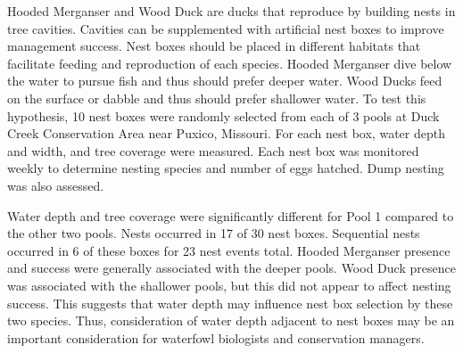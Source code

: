 
Hooded Merganser and Wood Duck are ducks that reproduce by building nests in tree cavities. Cavities can be supplemented with artificial nest boxes to improve management success. Nest boxes should be placed in different habitats that facilitate feeding and reproduction of each species.  Hooded Merganser dive below the water to pursue fish and thus should prefer deeper water. Wood Ducks feed on the surface or dabble and thus should prefer shallower water. To test this hypothesis, 10 nest boxes were randomly selected from each of 3 pools at Duck Creek Conservation Area near Puxico, Missouri. For each nest box, water depth and width, and tree coverage were measured. Each nest box was monitored weekly to determine nesting species and number of eggs hatched. Dump nesting was also assessed. 

Water depth and tree coverage were significantly different for Pool 1 compared to the other two pools. Nests occurred in 17 of 30 nest boxes. Sequential nests occurred in 6 of these boxes for 23 nest events total. Hooded Merganser presence and success were generally associated with the deeper pools. Wood Duck presence was associated with the shallower pools, but this did not appear to affect nesting success. This suggests that water depth may influence nest box selection by these two species. Thus, consideration of water depth adjacent to nest boxes may be an important consideration for waterfowl biologists and conservation managers.  
